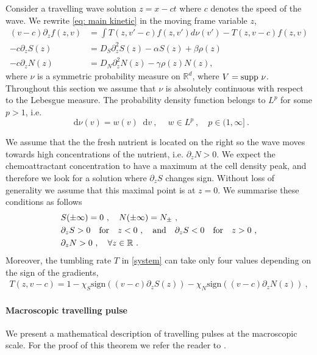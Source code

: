 \documentclass[11pt,twoside]{article}
\theoremstyle{nonumberplain}
\newcommand*\diff{\mathop{}\!\mathrm{d}}
\begin{document}
Consider a travelling wave solution $z=x-ct$ where $c$ denotes the speed of the wave. We rewrite \eqref{eq: main kinetic} in the moving frame variable $z$,
\begin{equation}
\begin{aligned}\label{system}
(v-c)\partial_zf(z,v)&=\int T(z,v'-c)f(z,v')d\nu(v')-T(z,v-c)f(z,v)\\
-c\partial_z S(z)&=D_S\partial_{z}^2S(z)-\alpha S(z)+\beta \rho(z)\\
-c\partial_zN(z)&=D_N\partial_{z}^2N(z)-\gamma\rho(z) N(z)
,
\end{aligned}
\end{equation}
where $\nu$ is a symmetric probability measure on $\mathbb{R}^d$, where $V=\textnormal{supp}\ \nu$. Throughout this section we assume that $\nu$ is absolutely continuous with respect to the Lebesgue measure. The probability density function belongs to $L^p$ for some $p > 1$, i.e.
\[
\diff \nu (v)=w(v)\diff v\ ,\ \quad w\in L^p\ , \quad p\in(1,\infty]\ .
\]

We assume that the the fresh nutrient is located on the right so the wave moves towards high concentrations of the nutrient, i.e.  $\partial_zN>0$. We expect the chemoattractant concentration to have a maximum at the cell density peak, and therefore we look for a solution where  $\partial_zS$ changes sign. Without loss of generality we assume that this maximal point is at $z=0$.  We summarise these conditions as follows
\begin{equation}
\begin{aligned}
 &S(\pm \infty)=0\ ,\quad N(\pm\infty)=N_\pm\ ,\\
&\partial_z S>0  \quad  \textrm{for}\quad z<0\ , \quad\textnormal{and}\quad\partial_z S<0 \quad \textrm{for}\quad z>0\ ,\\
&\partial_zN>0\ ,\quad\forall z\in\mathbb{R}\ .\label{eq: cond chemicals}
\end{aligned}
\end{equation}
Moreover, the tumbling rate $T$ in \eqref{system} can take only four values depending on the sign of the gradients,
\begin{eqnarray}\label{tumbl}
   T(z,v-c)=1-\chi_S \textrm{sign}((v-c)\partial_z S(z))-\chi_N \textrm{sign}((v-c)\partial_z N(z))\ ,
\end{eqnarray}

\paragraph{Macroscopic travelling pulse}
We present a mathematical description of travelling pulses at the macroscopic scale. For the proof of this theorem we refer the reader to \cite{calvez2016chemotactic}.
\end{document}
